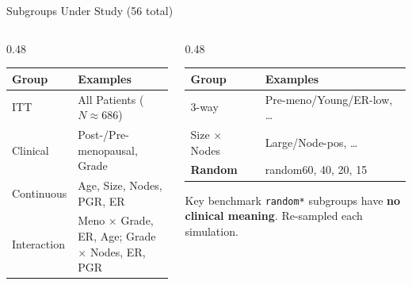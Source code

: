 \documentclass[
  11pt,
  ignorenonframetext,
  aspectratio=169,
]{beamer}
\begin{document}
\begin{frame}{Subgroups Under Study (56 total)}
\label{subgroups-under-study-56-total}
\footnotesize
\begin{columns}[T]
\begin{column}{0.48\textwidth}
\begin{tabular}{lp{3.5cm}}
\toprule
\textbf{Group} & \textbf{Examples} \\
\midrule
ITT & All Patients ($N\!\approx\!686$) \\
Clinical & Post-/Pre-menopausal, Grade \\
Continuous & Age, Size, Nodes, PGR, ER \\
Interaction & Meno $\times$ Grade, ER, Age; Grade $\times$ Nodes, ER, PGR \\
\bottomrule
\end{tabular}
\end{column}
\begin{column}{0.48\textwidth}
\begin{tabular}{lp{3.5cm}}
\toprule
\textbf{Group} & \textbf{Examples} \\
\midrule
3-way & Pre-meno/Young/ER-low, \ldots \\
Size $\times$ Nodes & Large/Node-pos, \ldots \\
\textcolor{randomorange}{\textbf{Random}} & \textcolor{randomorange}{random60, 40, 20, 15} \\
\bottomrule
\end{tabular}

\medskip

\begin{alertblock}{\footnotesize Key benchmark}
\textcolor{randomorange}{\texttt{random*}} subgroups have
\textbf{no clinical meaning}. Re-sampled each simulation.
\end{alertblock}
\end{column}
\end{columns}
\end{frame}
\end{document}
